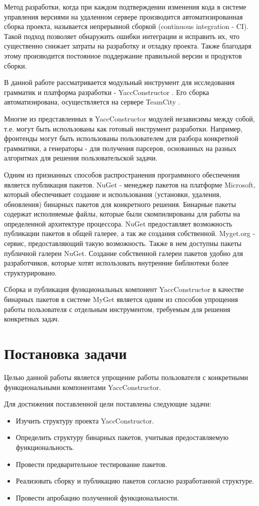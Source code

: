 \documentclass{matmex-diploma-custom}
\begin{document}
Метод разработки, когда при каждом подтверждении изменения кода в системе управления версиями на удаленном сервере производится автоматизированная сборка проекта, называется непрерывной сборкой (continuous integration - CI). Такой подход позволяет обнаружить ошибки интеграции и исправить их, что существенно снижает затраты на разработку и отладку проекта. Также благодаря этому производится постоянное поддержание правильной версии и продуктов сборки.

В данной работе рассматривается модульный инструмент для исследования грамматик и платформа разработки - YaccConstructor \cite{web:yc}. Его сборка автоматизирована, осуществляется на сервере TeamCity \cite{web:tc}.

Многие из представленных в YaccConstructor модулей независимы между собой, т.е. могут быть использованы как готовый инструмент разработки. Например, фронтенды могут быть использованы пользователем для разбора конкретной грамматики, а генераторы - для получения парсеров, основанных на разных алгоритмах для решения пользовательской задачи. 

Одним из признанных способов распространения программного обеспечения является публикация пакетов. NuGet \cite{web:ng} - менеджер пакетов на платформе Microsoft, который обеспечивает создание и использования (установки, удаления, обновления) бинарных пакетов для конкретного решения. Бинарные пакеты содержат исполняемые файлы, которые были скомпилированы для работы на определенной архитектуре процессора. NuGet предоставляет возможность публикации пакетов в общей галерее, а так же создания собственной. Myget.org - сервис, предоставляющий такую возможность. Также в нем доступны пакеты публичной галереи NuGet. Создание собственной галереи пакетов удобно для разработчиков, которые хотят использовать внутренние библиотеки более структурировано. 

Сборка и публикация функциональных компонент YaccConstructor в качестве бинарных пакетов в системе MyGet является одним из способов упрощения работы пользователя с отдельным инструментом, требуемым для решения конкретных задач.


\section{Постановка задачи}
Целью данной работы является упрощение работы пользователя с конкретными функциональными компонентами YaccConstructor.

Для достижения поставленной цели поставлены следующие задачи:
\begin{itemize}
\item Изучить структуру проекта YaccConstructor.
\item Определить структуру бинарных пакетов, учитывая предоставляемую функциональность.
\item Провести предварительное тестирование пакетов.
\item Реализовать сборку и публикацию пакетов согласно разработанной структуре.
\item Провести апробацию полученной функциональности. 
\end{itemize}
\end{document}
